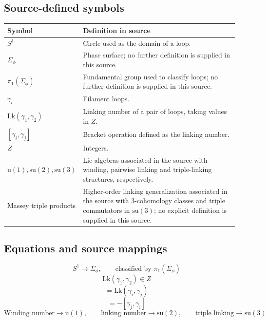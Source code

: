 \documentclass[11pt]{article}
\begin{document}
\subsection*{Source-defined symbols}
\small
\begin{longtable}{L{0.24\linewidth}L{0.70\linewidth}}
\toprule
\textbf{Symbol} & \textbf{Definition in source}\\
\midrule
\endhead
$S^1$ & Circle used as the domain of a loop.\\
$\Sigma_\phi$ & Phase surface; no further definition is supplied in this source.\\
$\pi_1(\Sigma_\phi)$ & Fundamental group used to classify loops; no further definition is supplied in this source.\\
$\gamma_i$ & Filament loops.\\
$\mathrm{Lk}(\gamma_1,\gamma_2)$ & Linking number of a pair of loops, taking values in $Z$.\\
$[\gamma_i,\gamma_j]$ & Bracket operation defined as the linking number.\\
$Z$ & Integers.\\
$\mathrm{u}(1),\mathrm{su}(2),\mathrm{su}(3)$ & Lie algebras associated in the source with winding, pairwise linking and triple-linking structures, respectively.\\
Massey triple products & Higher-order linking generalization associated in the source with 3-cohomology classes and triple commutators in $\mathrm{su}(3)$; no explicit definition is supplied in this source.\\
\bottomrule
\end{longtable}
\normalsize

\subsection*{Equations and source mappings}
\begin{equation*}
 S^1\longrightarrow\Sigma_\phi,\qquad \text{classified by }\pi_1(\Sigma_\phi)
\end{equation*}
\begin{equation*}
 \mathrm{Lk}(\gamma_1,\gamma_2)\in Z
\end{equation*}
\begin{equation*}
 [\gamma_i,\gamma_j]=\mathrm{Lk}(\gamma_i,\gamma_j)
\end{equation*}
\begin{equation*}
 [\gamma_i,\gamma_j]=-[\gamma_j,\gamma_i]
\end{equation*}
\begin{equation*}
 \text{Winding number}\longrightarrow \mathrm{u}(1),\qquad
 \text{linking number}\longrightarrow \mathrm{su}(2),\qquad
 \text{triple linking}\longrightarrow \mathrm{su}(3)
\end{equation*}
\end{document}
